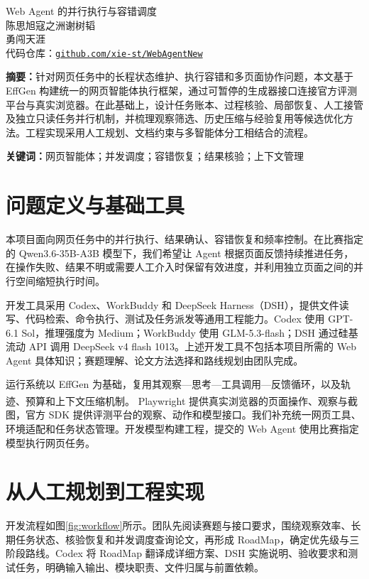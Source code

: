 \documentclass[UTF8,zihao=5,fontset=windows,a4paper]{ctexart}
\newcommand{\citepaper}[1]{\textsuperscript{\textcolor{blue}{\cite{#1}}}}
\begin{document}
\thispagestyle{plain}
\begin{center}
{\heiti\color{navy}\fontsize{18}{25}\selectfont Web Agent 的并行执行与容错调度}\\[10pt]
{\fontsize{11}{16}\selectfont 陈思旭\quad 寇之洲\quad 谢树韬}\\[3pt]
{\small 勇闯天涯}\\[4pt]
{\footnotesize 代码仓库：\href{https://github.com/xie-st/WebAgentNew}{\texttt{github.com/xie-st/WebAgentNew}}}
\end{center}
\vspace{3pt}
\begingroup
\small
\noindent\textbf{摘要：}针对网页任务中的长程状态维护、执行容错和多页面协作问题，本文基于 EffGen 构建统一的网页智能体执行框架，通过可暂停的生成器接口连接官方评测平台与真实浏览器。在此基础上，设计任务账本、过程核验、局部恢复、人工接管及独立只读任务并行机制，并梳理观察筛选、历史压缩与经验复用等候选优化方法。工程实现采用人工规划、文档约束与多智能体分工相结合的流程。
\par\vspace{3pt}
\noindent\textbf{关键词：}网页智能体；并发调度；容错恢复；结果核验；上下文管理
\par
\endgroup
\vspace{4pt}
\section{问题定义与基础工具}
本项目面向网页任务中的并行执行、结果确认、容错恢复和频率控制。在比赛指定的 Qwen3.6-35B-A3B 模型下，我们希望让 Agent 根据页面反馈持续推进任务，在操作失败、结果不明或需要人工介入时保留有效进度，并利用独立页面之间的并行空间缩短执行时间。

开发工具采用 Codex、WorkBuddy 和 DeepSeek Harness（DSH），提供文件读写、代码检索、命令执行、测试及任务派发等通用工程能力。Codex 使用 GPT-6.1 Sol，推理强度为 Medium；WorkBuddy 使用 GLM-5.3-flash；DSH 通过硅基流动 API 调用 DeepSeek v4 flash 1013。上述开发工具不包括本项目所需的 Web Agent 具体知识；赛题理解、论文方法选择和路线规划由团队完成。

运行系统以 EffGen 为基础，复用其观察—思考—工具调用—反馈循环，以及轨迹、预算和上下文压缩机制。\citepaper{effgen} Playwright 提供真实浏览器的页面操作、观察与截图，官方 SDK 提供评测平台的观察、动作和模型接口。我们补充统一网页工具、环境适配和任务状态管理。开发模型构建工程，提交的 Web Agent 使用比赛指定模型执行网页任务。

\section{从人工规划到工程实现}
开发流程如图\ref{fig:workflow}所示。团队先阅读赛题与接口要求，围绕观察效率、长期任务状态、核验恢复和并发调度查询论文，再形成 RoadMap，确定优先级与三阶段路线。Codex 将 RoadMap 翻译成详细方案、DSH 实施说明、验收要求和测试任务，明确输入输出、模块职责、文件归属与前置依赖。
\end{document}
